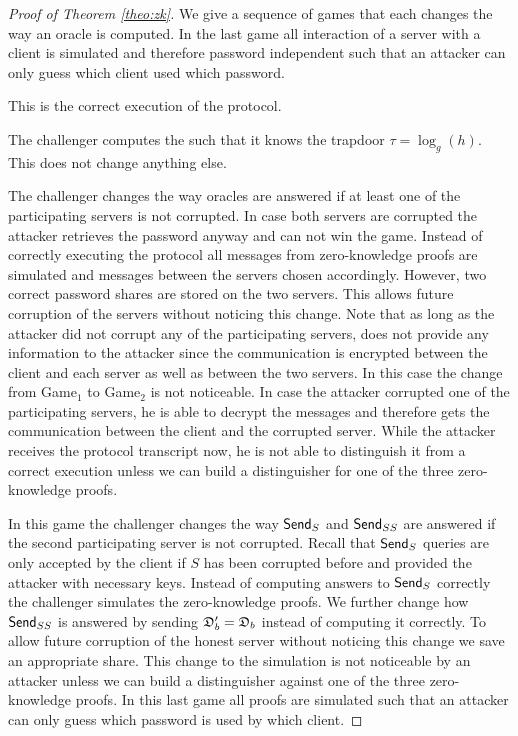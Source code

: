 \begin{proof}[Proof of Theorem \ref{theo:zk}]
We give a sequence of games that each changes the way an oracle is computed.
In the last game all interaction of a server with a client is simulated and therefore password independent such that an attacker can only guess which client used which password.

This is the correct execution of the protocol.

The challenger computes the \crs such that it knows the trapdoor $\tau=\log_g(h)$.
This does not change anything else.

The challenger changes the way \Execute oracles are answered if at least one of the participating servers is not corrupted.
In case both servers are corrupted the attacker retrieves the password anyway and can not win the game.
Instead of correctly executing the protocol all messages from zero-knowledge proofs are simulated and messages between the servers chosen accordingly.
However, two correct password shares are stored on the two servers.
This allows future corruption of the servers without noticing this change.
Note that as long as the attacker did not corrupt any of the participating servers, \Execute does not provide any information to the attacker since the communication is encrypted between the client and each server as well as between the two servers.
In this case the change from Game$_1$ to Game$_2$ is not noticeable.
In case the attacker corrupted one of the participating servers, he is able to decrypt the messages and therefore gets the communication between the client and the corrupted server.
While the attacker receives the protocol transcript now, he is not able to distinguish it from a correct execution unless we can build a distinguisher for one of the three zero-knowledge proofs.

In this game the challenger changes the way $\mathsf{Send}_{S}$ and $\mathsf{Send}_{SS}$ are answered if the second participating server is not corrupted.
Recall that $\mathsf{Send}_S$ queries are only accepted by the client if $S$ has been corrupted before and provided the attacker with necessary keys.
Instead of computing answers to $\mathsf{Send}_S$ correctly the challenger simulates the zero-knowledge proofs.
We further change how $\mathsf{Send}_{SS}$ is answered by sending $\mathfrak{D}'_b=\mathfrak{D}_b$ instead of computing it correctly.
To allow future corruption of the honest server without noticing this change we save an appropriate share.
This change to the simulation is not noticeable by an attacker unless we can build a distinguisher against one of the three zero-knowledge proofs.
In this last game all proofs are simulated such that an attacker can only guess which password is used by which client.
\end{proof}


